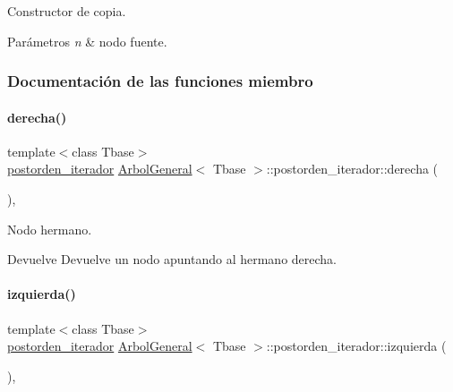 Constructor de copia. 


\begin{DoxyParams}{Parámetros}
{\em n} & nodo fuente. \\
\hline
\end{DoxyParams}


\subsubsection{Documentación de las funciones miembro}
\hypertarget{classArbolGeneral_1_1postorden__iterador_ae2b24cd3445cac918c67574c0879b189}{}\label{classArbolGeneral_1_1postorden__iterador_ae2b24cd3445cac918c67574c0879b189} 
\paragraph{\texorpdfstring{derecha()}{derecha()}}
{\footnotesize\ttfamily template$<$class Tbase$>$ \\
\hyperlink{classArbolGeneral_1_1postorden__iterador}{postorden\+\_\+iterador} \hyperlink{classArbolGeneral}{Arbol\+General}$<$ Tbase $>$\+::postorden\+\_\+iterador\+::derecha (\begin{DoxyParamCaption}{ }\end{DoxyParamCaption})\hspace{0.3cm}{\ttfamily [inline]}, {\ttfamily [private]}}



Nodo hermano. 

\begin{DoxyReturn}{Devuelve}
Devuelve un nodo apuntando al hermano derecha. 
\end{DoxyReturn}
\hypertarget{classArbolGeneral_1_1postorden__iterador_a41de2f17fa6fd5f76654770858d4f3b2}{}\label{classArbolGeneral_1_1postorden__iterador_a41de2f17fa6fd5f76654770858d4f3b2} 
\paragraph{\texorpdfstring{izquierda()}{izquierda()}}
{\footnotesize\ttfamily template$<$class Tbase$>$ \\
\hyperlink{classArbolGeneral_1_1postorden__iterador}{postorden\+\_\+iterador} \hyperlink{classArbolGeneral}{Arbol\+General}$<$ Tbase $>$\+::postorden\+\_\+iterador\+::izquierda (\begin{DoxyParamCaption}{ }\end{DoxyParamCaption})\hspace{0.3cm}{\ttfamily [inline]}, {\ttfamily [private]}}



